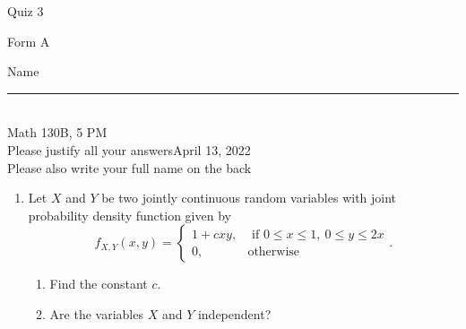 \documentclass[12pt]{article}
\begin{document}
\begin{flushleft} 
\centerline{\LARGE{Quiz 3}} 
\vspace{5 mm}
{Form A}\hfill  
{Name \rule {2 in}{0.01in}}\\
Math 130B, 5 PM
\\
{Please justify all your answers}\hfill {April 13, 2022}
\\
{Please also write your full name on the back} 

\medskip
\end{flushleft}

\begin{enumerate}




	\item Let $X$ and $Y$ be two jointly continuous random variables with joint probability density function given by
	\[
	f_{X,Y}(x,y) = \begin{cases}
		1 + cxy, & \text{ if }0\leq x \leq 1,\ 0\leq y\leq 2x\\
		0, & \text{otherwise}
	\end{cases}.
	\]
	\begin{enumerate}
		\item Find the constant $c$.
		\vfill

		\item Are the variables $X$ and $Y$ independent?
	\end{enumerate}

	\vfill\null
\end{enumerate}
\pagebreak
\end{document}
